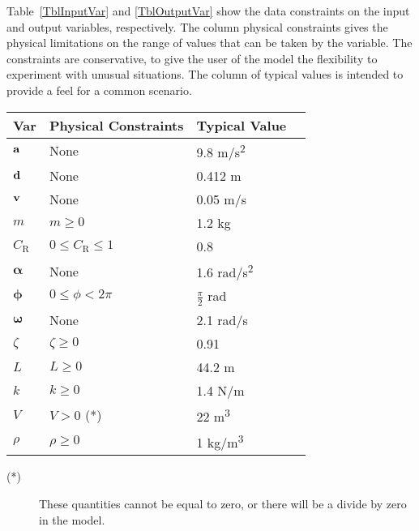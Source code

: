 \documentclass[12pt]{article}
\begin{document}
Table~\ref{TblInputVar} and \ref{TblOutputVar} show the data constraints on the
input and output variables, respectively.  The column physical constraints gives 
the physical limitations on the range of values that can be taken by the
variable.  The constraints are conservative, to give the user of the model the
flexibility to experiment with unusual situations.  The column of typical values
is intended to provide a feel for a common scenario. 

\begin{table}[!h]
\caption{Input Variables} \label{TblInputVar}
\renewcommand{\arraystretch}{1.2}
\noindent \begin{longtable}{l l l c} 
  \toprule
  \textbf{Var} & \textbf{Physical Constraints} & \textbf{Typical Value} \\
  \midrule 
  $\bf a$			& None			& 9.8 \si[per-mode=symbol]	{\metre\per\second^{2}}	
  \\
  $\bf d$			& None			& 0.412 \si[per-mode=symbol] {\metre}	
  \\
  $\bf v$			 & None 			& 0.05 \si[per-mode=symbol] {\metre\per\second}	
  \\
  $m$ 			& $m \ge 0$			& 1.2 \si[per-mode=symbol] {\kilo\gram}	
  \\
  $C_\text{R}$  	& $ 0 \le C_\text{R} \le 1$	& 0.8 
  \\	
  $\boldsymbol \alpha$ 		& None 			& 1.6 \si[per-mode=symbol] {\radian\per\second^2}
  \\
  $\boldsymbol \phi$		 & $ 0 \le \phi< 2\pi $	&$\frac{\pi}{2} $ \si[per-mode=symbol] {\radian}
  \\	
  $\boldsymbol \omega$ 		& None 			& 2.1 \si[per-mode=symbol] {\radian\per\second}
  \\
  $\zeta$ 		&$ \zeta \ge 0 $			& 0.91
  \\
  $L$ 			& $L\ge0$			&44.2 \si[per-mode=symbol] {\metre}
  \\
  $k$			& $k\ge0$			&1.4 \si[per-mode=symbol] {\newton\per\metre}
  \\
  $V$ 			& $V>0$ (*)			& 22 \si[per-mode=symbol] {\metre^{3}} 
  \\
  $\rho$ 		& $\rho\ge 0$ 		&1 \si[per-mode=symbol] {\kilo\gram\per\metre^{3}} 
  \\
  \bottomrule
\end{longtable}
\end{table}

\noindent \begin{description}
\item[(*)] These quantities cannot be equal to zero, or there will be a divide by
  zero in the model.
\end{description}
\end{document}
